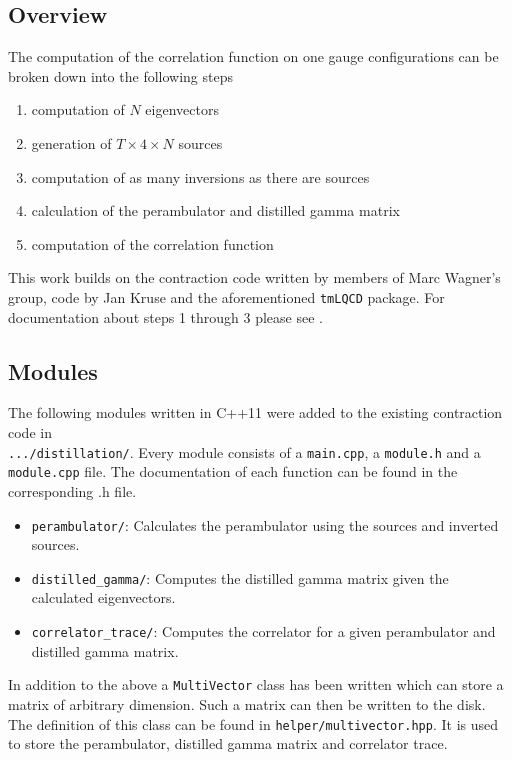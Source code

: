 \subsection{Overview}
    The computation of the correlation function on one gauge configurations can be broken down into the following steps
    \begin{enumerate}
        \item computation of $N$ eigenvectors
        \item generation of $T \times 4 \times N$ sources
        \item computation of as many inversions as there are sources
        \item calculation of the perambulator and distilled gamma matrix
        \item computation of the correlation function
    \end{enumerate}
    This work builds on the contraction code written by members of Marc Wagner's group, code by Jan Kruse and the aforementioned \verb+tmLQCD+ package. For documentation about steps 1 through 3 please see \cite{bachelor_thesis_jan}.



\subsection{Modules}
    The following modules written in C++11 were added to the existing contraction code in \\\verb+.../distillation/+. Every module consists of a \verb+main.cpp+, a \verb+module.h+ and a \verb+module.cpp+ file. The documentation of each function can be found in the corresponding .h file.  
    \begin{itemize}
        \item \verb+perambulator/+: Calculates the perambulator using the sources and inverted sources.
        \item \verb+distilled_gamma/+: Computes the distilled gamma matrix given the calculated eigenvectors.
        \item \verb+correlator_trace/+: Computes the correlator for a given perambulator and distilled gamma matrix.
    \end{itemize}
    
    \noindent
    In addition to the above a \verb+MultiVector+ class has been written which can store a matrix of arbitrary dimension. Such a matrix can then be written to the disk. The definition of this class can be found in \verb+helper/multivector.hpp+. It is used to store the perambulator, distilled gamma matrix and correlator trace.
    
